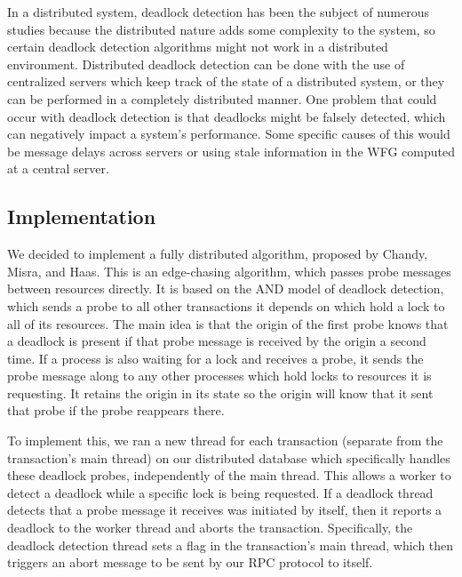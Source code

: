 \documentclass[a4paper, 10pt, notitlepage]{article}
\begin{document}
In a distributed system, deadlock detection has been the subject of numerous studies because the distributed nature adds some complexity to the system, so certain deadlock detection algorithms might not work in a distributed environment. Distributed deadlock detection can be done with the use of centralized servers which keep track of the state of a distributed system, or they can be performed in a completely distributed manner. One problem that could occur with deadlock detection is that deadlocks might be falsely detected, which can negatively impact a system's performance. Some specific causes of this would be message delays across servers or using stale information in the WFG computed at a central server.

\subsection{Implementation}
We decided to implement a fully distributed algorithm, proposed by Chandy, Misra, and Haas. This is an edge-chasing algorithm, which passes probe messages between resources directly. It is based on the AND model of deadlock detection, which sends a probe to all other transactions it depends on which hold a lock to all of its resources. The main idea is that the origin of the first probe knows that a deadlock is present if that probe message is received by the origin a second time. If a process is also waiting for a lock and receives a probe, it sends the probe message along to any other processes which hold locks to resources it is requesting. It retains the origin in its state so the origin will know that it sent that probe if the probe reappears there.

To implement this, we ran a new thread for each transaction (separate from the transaction's main thread) on our distributed database which specifically handles these deadlock probes, independently of the main thread. This allows a worker to detect a deadlock while a specific lock is being requested. If a deadlock thread detects that a probe message it receives was initiated by itself, then it reports a deadlock to the worker thread and aborts the transaction. Specifically, the deadlock detection thread sets a flag in the transaction's main thread, which then triggers an abort message to be sent by our RPC protocol to itself.
\end{document}
